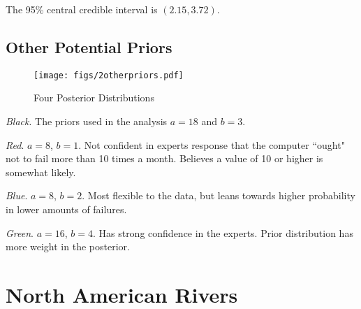 \documentclass[12pt]{article}
\begin{document}
\noindent The 95\% central credible interval is $(2.15, 3.72)$.

\subsection{Other Potential Priors}

\begin{figure}[H]
\begin{center}
\texttt{[image: figs/2otherpriors.pdf]}
\caption{Four Posterior Distributions}
\end{center}
\end{figure}

\noindent \emph{Black}.  The priors used in the analysis $a=18$ and $b=3$.

\noindent \emph{Red}. $a=8$, $b=1$.  Not confident in experts response that the computer ``ought" not to fail more than 10 times a month.  Believes a value of 10 or higher is somewhat likely.

\noindent \emph{Blue}. $a=8$, $b=2$.  Most flexible to the data, but leans towards higher probability in lower amounts of failures.

\noindent \emph{Green}. $a=16$, $b=4$.  Has strong confidence in the experts.  Prior distribution has more weight in the posterior.


%
%

\newpage

\section{North American Rivers}
\end{document}
